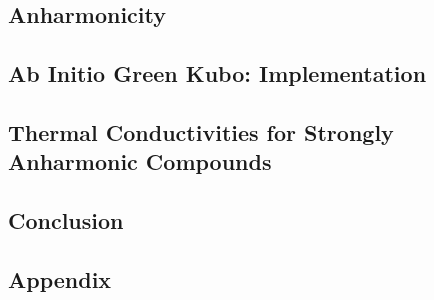 \documentclass[nobib,a4paper,twoside,notoc,justified,marginals=justified]{tufte-book}
\begin{document}
\chapter{Anharmonicity}


\chapter{Ab Initio Green Kubo: Implementation}


\chapter{Thermal Conductivities for Strongly Anharmonic Compounds}




\chapter*{Conclusion}


\cleardoublepage
{}
{}


\printbibliography

\newcommand{\bibsection}{\section{Bibliography}} %

\begin{appendices}
  \part*{Appendix}
  
\end{appendices}

\backmatter




\end{document}
